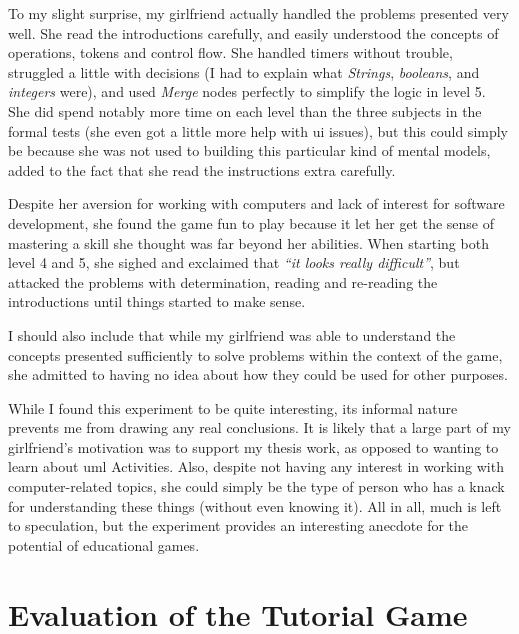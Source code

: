 \noindent
To my slight surprise, my girlfriend actually handled the problems presented very well. She read the introductions carefully, and easily understood the concepts of operations, tokens and control flow. She handled timers without trouble, struggled a little with decisions (I had to explain what \emph{Strings}, \emph{booleans}, and \emph{integers} were), and used \emph{Merge} nodes perfectly to simplify the logic in level 5. She did spend notably more time on each level than the three subjects in the formal tests (she even got a little more help with \gls{ui} issues), but this could simply be because she was not used to building this particular kind of mental models, added to the fact that she read the instructions extra carefully.

\noindent
Despite her aversion for working with computers and lack of interest for software development, she found the game fun to play because it let her get the sense of mastering a skill she thought was far beyond her abilities. When starting both level 4 and 5, she sighed and exclaimed that \emph{``it looks really difficult''}, but attacked the problems with determination, reading and re-reading the introductions until things started to make sense.

\noindent
I should also include that while my girlfriend was able to understand the concepts presented sufficiently to solve problems within the context of the game, she admitted to having no idea about how they could be used for other purposes.

\noindent
While I found this experiment to be quite interesting, its informal nature prevents me from drawing any real conclusions. It is likely that a large part of my girlfriend's motivation was to support my thesis work, as opposed to wanting to learn about \gls{uml} Activities. Also, despite not having any interest in working with computer-related topics, she could simply be the type of person who has a knack for understanding these things (without even knowing it). All in all, much is left to speculation, but the experiment provides an interesting anecdote for the potential of educational games.

\section{Evaluation of the Tutorial Game}


